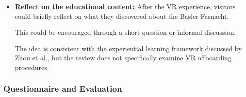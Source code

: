 \begin{itemize}
    \item \textbf{Reflect on the educational content:}
    After the VR experience, visitors could
    briefly reflect on what they discovered
    about the Basler Fasnacht.

    This could be encouraged through
    a short question or informal discussion.

    The idea is consistent with the experiential
    learning framework discussed by Zhou et al.,
    but the review does not specifically examine
    VR offboarding procedures.
    \cite[p.~2]{zhou_meta-analytic_2022}

\end{itemize}


\subsubsection{Questionnaire and Evaluation}


